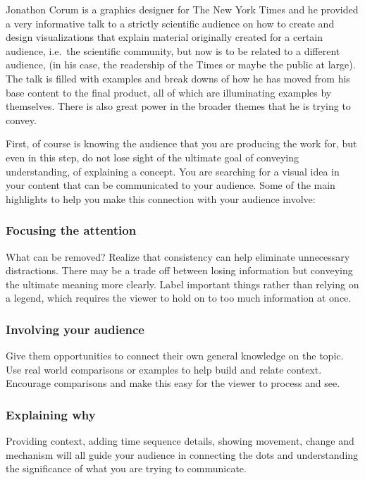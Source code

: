 \documentclass[]{book}
\theoremstyle{definition}
\theoremstyle{definition}
\theoremstyle{definition}
\theoremstyle{remark}
\begin{document}
Jonathon Corum is a graphics designer for The New York Times and he
provided a very informative talk to a strictly scientific audience on
how to create and design visualizations that explain material originally
created for a certain audience, i.e.~the scientific community, but now
is to be related to a different audience, (in his case, the readership
of the Times or maybe the public at large). The talk is filled with
examples and break downs of how he has moved from his base content to
the final product, all of which are illuminating examples by themselves.
There is also great power in the broader themes that he is trying to
convey.

First, of course is knowing the audience that you are producing the work
for, but even in this step, do not lose sight of the ultimate goal of
conveying understanding, of explaining a concept. You are searching for
a visual idea in your content that can be communicated to your audience.
Some of the main highlights to help you make this connection with your
audience involve:

\subsubsection{Focusing the attention}\label{focusing-the-attention}

What can be removed? Realize that consistency can help eliminate
unnecessary distractions. There may be a trade off between losing
information but conveying the ultimate meaning more clearly. Label
important things rather than relying on a legend, which requires the
viewer to hold on to too much information at once.

\subsubsection{Involving your audience}\label{involving-your-audience}

Give them opportunities to connect their own general knowledge on the
topic. Use real world comparisons or examples to help build and relate
context. Encourage comparisons and make this easy for the viewer to
process and see.

\subsubsection{Explaining why}\label{explaining-why}

Providing context, adding time sequence details, showing movement,
change and mechanism will all guide your audience in connecting the dots
and understanding the significance of what you are trying to
communicate.
\end{document}

